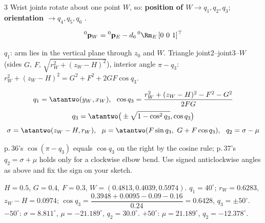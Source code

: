 \begin{multicols}{3}
Wrist joints rotate about one point $W$, so: \textbf{position of $W\to q_1,q_2,q_3$}; \textbf{orientation $\to q_4,q_5,q_6$} .
\begin{fbx}
\[{}^0\mathbf p_W={}^0\mathbf p_E-d_6\,{}^0\Rm_E\,[0\ 0\ 1]^\top\]
\end{fbx}
\begin{deriv}
$q_1$: arm lies in the vertical plane through $z_0$ and $W$. Triangle joint2--joint3--$W$ (sides $G$, $F$, $\sqrt{r_W^2+(z_W-H)^2}$), interior angle $\pi-q_3$: $r_W^2+(z_W-H)^2=G^2+F^2+2GF\cos q_3$.
\end{deriv}
\begin{fbx}
\[q_1=\atantwo(y_W,x_W),\ \ \cos q_3=\frac{r_W^2+(z_W-H)^2-F^2-G^2}{2FG}\]\[q_3=\atantwo\big(\pm\sqrt{1-\cos^2q_3},\cos q_3\big)\]
\[\sigma=\atantwo(z_W-H,r_W),\ \ \mu=\atantwo(F\sin q_3,\ G+F\cos q_3),\ \ q_2=\sigma-\mu\]
\end{fbx}
\begin{slideerr}[pp.\,36--37]
p.\,36's $\cos(\pi-q_3)$ equals $\cos q_3$ on the right by the cosine rule; p.\,37's $q_2=\sigma+\mu$ holds only for a clockwise elbow bend. Use signed anticlockwise angles as above and fix the sign on your sketch. \chk
\end{slideerr}
\begin{worked}
$H=0.5$, $G=0.4$, $F=0.3$, $W=(0.4813,0.4039,0.5974)$. $q_1=40^\circ$; $r_W=0.6283$, $z_W-H=0.0974$; $\cos q_3=\dfrac{0.3948+0.0095-0.09-0.16}{0.24}=0.6428$, $q_3=\pm50^\circ$.\\
$-50^\circ$: $\sigma=8.811^\circ$, $\mu=-21.189^\circ$, $q_2=\mathbf{30.0^\circ}$. $+50^\circ$: $\mu=21.189^\circ$, $q_2=-12.378^\circ$.\\

\end{worked}
\end{multicols}
